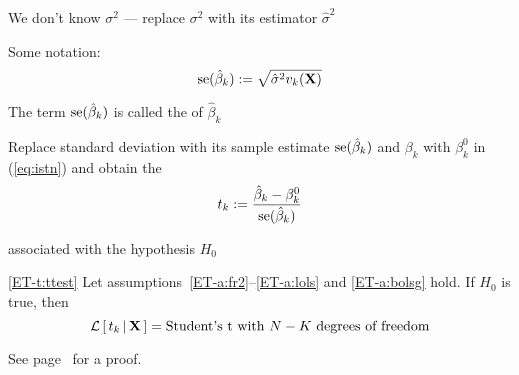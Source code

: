 \begin{frame}

    \vspace{2em}
    We don't know $\sigma^2$ ---
    replace $\sigma^2$ with its estimator $\hat \sigma^2$
    
    Some notation:
    \begin{equation*}
        \operatorname{se}(\hat \beta_k) := \sqrt{ \hat \sigma^2 v_k(\mathbf X)}
    \end{equation*}
    
    \vspace{.7em}
    The term $\operatorname{se}(\hat \beta_k)$ is called the  of $\hat
    \beta_k$
    
    \vspace{.7em}
    Replace standard deviation
    with its sample estimate $\operatorname{se}(\hat \beta_k)$ and $\beta_k$ with $\beta_k^0$ in
    (\ref{eq:istn}) and obtain the 
    \begin{equation*}
        \label{eq:tstat}
        t_k := \frac{\hat \beta_k - \beta_k^0}{\operatorname{se}(\hat \beta_k)}
    \end{equation*}
    
    associated with the hypothesis $H_0$

\end{frame}

\begin{frame}

    \vspace{2em}
    \Thm
    \eqref{ET-t:ttest}
    Let assumptions~\ref{ET-a:fr2}--\ref{ET-a:lols} and \ref{ET-a:bolsg} hold.
    If $H_0$ is true,
    then 
    \begin{equation*}
        \mathcal L \left[ \, t_k \, | \, \mathbf X \, \right] = 
        \text{Student's t with $N-K$ degrees of freedom}
    \end{equation*}
    
    See page~\pageref{ET-t:ttest} for a proof. 


\end{frame}

